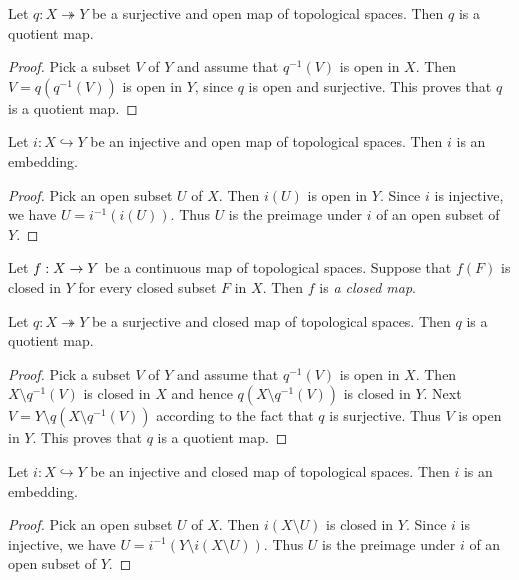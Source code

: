 \begin{fact}\label{fact:open_surjective_maps_are_quotient_maps}
	Let $q:X \twoheadrightarrow Y$ be a surjective and open map of topological spaces. Then $q$ is a quotient map.
\end{fact}
\begin{proof}
	Pick a subset $V$ of $Y$ and assume that $q^{-1}(V)$ is open in $X$. Then $V = q\left(q^{-1}(V)\right)$ is open in $Y$, since $q$ is open and surjective. This proves that $q$ is a quotient map.
\end{proof}

\begin{fact}\label{fact:open_injective_maps_are_embeddings}
	Let $i:X \hookrightarrow Y$ be an injective and open map of topological spaces. Then $i$ is an embedding.
\end{fact}
\begin{proof}
	Pick an open subset $U$ of $X$. Then $i(U)$ is open in $Y$. Since $i$ is injective, we have $U = i^{-1}\left(i(U)\right)$. Thus $U$ is the preimage under $i$ of an open subset of $Y$.
\end{proof}

\begin{definition}
	Let $f:X \rightarrow Y$ be a continuous map of topological spaces. Suppose that $f(F)$ is closed in $Y$ for every closed subset $F$ in $X$. Then $f$ is \textit{a closed map}.
\end{definition}

\begin{fact}\label{fact:closed_surjective_maps_are_quotient_maps}
	Let $q:X \twoheadrightarrow Y$ be a surjective and closed map of topological spaces. Then $q$ is a quotient map.
\end{fact}
\begin{proof}
	Pick a subset $V$ of $Y$ and assume that $q^{-1}(V)$ is open in $X$. Then $X\setminus q^{-1}(V)$ is closed in $X$ and hence $q\left(X\setminus q^{-1}(V)\right)$ is closed in $Y$. Next $V = Y \setminus q\left(X\setminus q^{-1}(V)\right)$ according to the fact that $q$ is surjective. Thus $V$ is open in $Y$. This proves that $q$ is a quotient map.
\end{proof}

\begin{fact}\label{fact:closed_injective_maps_are_embeddings}
	Let $i:X \hookrightarrow Y$ be an injective and closed map of topological spaces. Then $i$ is an embedding.
\end{fact}
\begin{proof}
	Pick an open subset $U$ of $X$. Then $i(X\setminus U)$ is closed in $Y$. Since $i$ is injective, we have $U = i^{-1}\left(Y\setminus i(X\setminus U)\right)$. Thus $U$ is the preimage under $i$ of an open subset of $Y$.
\end{proof}

